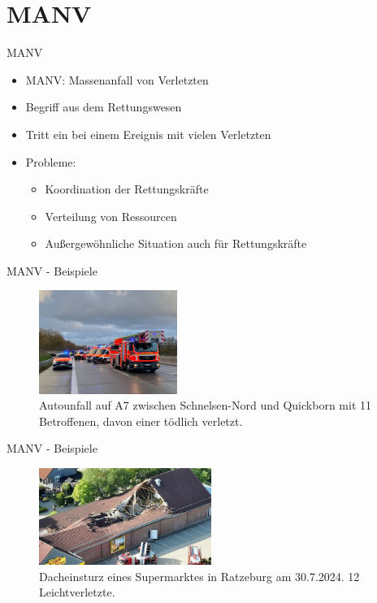 
\section{MANV}

\begin{frame}{MANV}
	\begin{itemize}
		\item MANV: \alert{Massenanfall von Verletzten}
		\item Begriff aus dem Rettungswesen
		\item Tritt ein bei einem Ereignis mit vielen Verletzten
		\item Probleme:
		      \begin{itemize}
			      \item Koordination der Rettungskräfte
			      \item Verteilung von Ressourcen
			      \item Außergewöhnliche Situation auch für Rettungskräfte
		      \end{itemize}
	\end{itemize}
\end{frame}

\begin{frame}{MANV - Beispiele}
	\begin{figure}
		\begin{center}
			\includegraphics[width=0.4\textwidth]{images/autounfall.jpg}
		\end{center}
		\caption{Autounfall auf A7 zwischen Schnelsen-Nord und Quickborn mit 11 Betroffenen, davon einer tödlich verletzt.\cite{manv-a7}}\label{fig:autounfall}
	\end{figure}
\end{frame}

\begin{frame}{MANV - Beispiele}
	\begin{figure}
		\begin{center}
			\includegraphics[width=0.5\textwidth]{images/ratzeburg-netto.jpg}
		\end{center}
		\caption{Dacheinsturz eines Supermarktes in Ratzeburg am 30.7.2024. 12 Leichtverletzte.\cite{manv-ratzeburg}}\label{fig:netto}
	\end{figure}
\end{frame}


